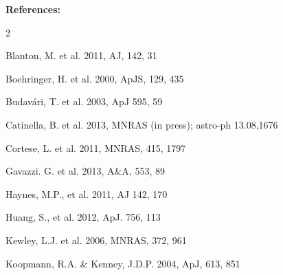 \documentclass[11pt]{article}
\begin{document}
\begin{center}
\bf References:\\
\end{center}
\begin{multicols}{2}
\small


\noindent Blanton, M. et al. 2011, AJ, 142, 31

\noindent Boehringer, H. et al. 2000, ApJS, 129, 435

\noindent Budav\'{a}ri, T. et al. 2003, ApJ 595, 59

\noindent Catinella, B. et al. 2013, MNRAS (in press); astro-ph 13.08,1676


\noindent Cortese, L. et al. 2011, MNRAS, 415, 1797





\noindent Gavazzi. G. et al. 2013, A\&A, 553, 89





\noindent Haynes, M.P., et al. 2011, AJ 142, 170

\noindent Huang, S., et al. 2012, ApJ. 756, 113



\noindent Kewley, L.J. et al. 2006, MNRAS, 372, 961

\noindent Koopmann, R.A. \& Kenney, J.D.P. 2004, ApJ, 613, 851




\end{multicols}
\end{document}
